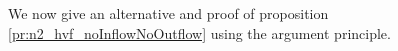 We now give an alternative and proof of proposition \ref{pr:n2_hvf_noInflowNoOutflow} using the argument principle.
